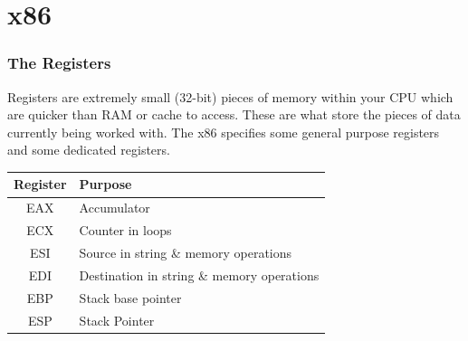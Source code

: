 \documentclass{beamer}
\begin{document}
	\section{x86}
	
	\begin{frame}
		\frametitle{The Registers}
		
		Registers are extremely small (32-bit) pieces of memory within your CPU which are quicker than RAM or cache to access. These are what store the pieces of data currently being worked with. The x86 specifies some general purpose registers and some dedicated registers. 
		\newline
		
		\begin{tabular}{|c|l|}
			\hline
			\textbf{Register} & \textbf{Purpose} \\
			\hline
			\hline
			EAX & Accumulator\\
			\hline
			ECX & Counter in loops\\
			\hline
			ESI & Source in string \& memory operations\\
			\hline
			EDI & Destination in string \& memory operations\\
			\hline
			EBP & Stack base pointer\\
			\hline
			ESP & Stack Pointer\\
			\hline
		\end{tabular}
	\end{frame}
\end{document}
